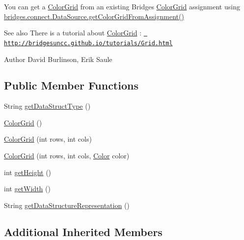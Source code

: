 You can get a \mbox{\hyperlink{classbridges_1_1base_1_1_color_grid}{Color\+Grid}} from an existing Bridges \mbox{\hyperlink{classbridges_1_1base_1_1_color_grid}{Color\+Grid}} assignment using \mbox{\hyperlink{classbridges_1_1connect_1_1_data_source_a9556950d89b39ce61bead0879d1e2192}{bridges.\+connect.\+Data\+Source.\+get\+Color\+Grid\+From\+Assignment()}}

\begin{DoxySeeAlso}{See also}
There is a tutorial about \mbox{\hyperlink{classbridges_1_1base_1_1_color_grid}{Color\+Grid}} \+: \href{http://bridgesuncc.github.io/tutorials/Grid.html}{\texttt{ http\+://bridgesuncc.\+github.\+io/tutorials/\+Grid.\+html}}
\end{DoxySeeAlso}
\begin{DoxyAuthor}{Author}
David Burlinson, Erik Saule 
\end{DoxyAuthor}
\subsection*{Public Member Functions}
\begin{DoxyCompactItemize}
\item 
String \mbox{\hyperlink{classbridges_1_1base_1_1_color_grid_a53a1f3f105f8545796f98e5fac559b5b}{get\+Data\+Struct\+Type}} ()
\item 
\mbox{\hyperlink{classbridges_1_1base_1_1_color_grid_af434a5a3dcbaf86e51ac6f9e1c1d7e5f}{Color\+Grid}} ()
\item 
\mbox{\hyperlink{classbridges_1_1base_1_1_color_grid_aafb4157a4c8129f30c1f989fcdfda544}{Color\+Grid}} (int rows, int cols)
\item 
\mbox{\hyperlink{classbridges_1_1base_1_1_color_grid_aef40242c93b66ab851e6afa64cada0b5}{Color\+Grid}} (int rows, int cols, \mbox{\hyperlink{classbridges_1_1base_1_1_color}{Color}} color)
\item 
int \mbox{\hyperlink{classbridges_1_1base_1_1_color_grid_a8793791e35f03b3e5a2e5ef3606ac124}{get\+Height}} ()
\item 
int \mbox{\hyperlink{classbridges_1_1base_1_1_color_grid_af872226de86ac8e8f2553fdc5bddc375}{get\+Width}} ()
\item 
String \mbox{\hyperlink{classbridges_1_1base_1_1_color_grid_a81ca0995d17b6cb31122b718dfa57286}{get\+Data\+Structure\+Representation}} ()
\end{DoxyCompactItemize}
\subsection*{Additional Inherited Members}


